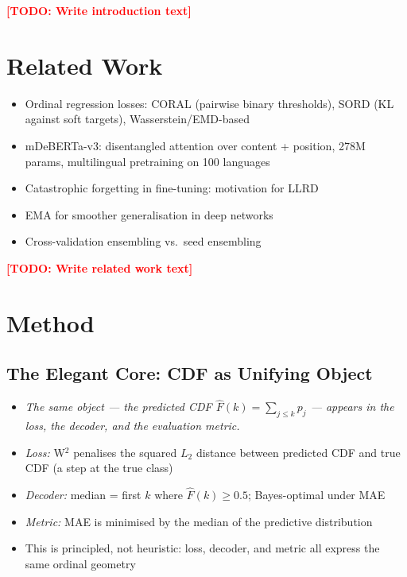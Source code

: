\documentclass{article}
\newcommand{\TODO}[1]{\textcolor{red}{\textbf{[TODO: #1]}}}
\newcommand{\KP}[1]{\textit{#1}}   %
\begin{document}
\TODO{Write introduction text}

\section{Related Work}
\label{sec:related}

\begin{itemize}[leftmargin=*,itemsep=1pt]
  \item Ordinal regression losses: CORAL (pairwise binary thresholds),
        SORD (KL against soft targets), Wasserstein/EMD-based
  \item mDeBERTa-v3: disentangled attention over content + position,
        278M params, multilingual pretraining on 100 languages
  \item Catastrophic forgetting in fine-tuning: motivation for LLRD
  \item EMA for smoother generalisation in deep networks
  \item Cross-validation ensembling vs.\ seed ensembling
\end{itemize}

\TODO{Write related work text}

\section{Method}
\label{sec:method}

\subsection{The Elegant Core: CDF as Unifying Object}

\begin{itemize}[leftmargin=*,itemsep=1pt]
  \item \KP{The same object --- the predicted CDF $\hat{F}(k) = \sum_{j \leq k} p_j$
        --- appears in the loss, the decoder, and the evaluation metric.}
  \item \KP{Loss:} W$^2$ penalises the squared $L_2$ distance between
        predicted CDF and true CDF (a step at the true class)
  \item \KP{Decoder:} median = first $k$ where $\hat{F}(k) \geq 0.5$;
        Bayes-optimal under MAE
  \item \KP{Metric:} MAE is minimised by the median of the predictive distribution
  \item This is principled, not heuristic: loss, decoder, and metric
        all express the same ordinal geometry
\end{itemize}
\end{document}
